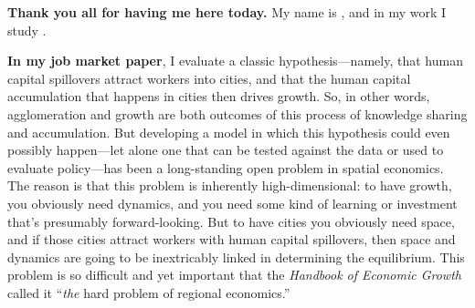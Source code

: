 \documentclass{jmstatement}
\begin{document}
\pagestyle{fancy}
\fancyhf{}
\fancyhead[L]{\bfseries\scshape \myname}
\fancyfoot[C]{\thepage}







\textbf{Thank you all for having me here today.} My name is \myname, and in
my work I study \onesenID.


\textbf{In my job market paper},
I evaluate a classic hypothesis---namely, that
human capital spillovers attract workers into cities,
and that the human capital accumulation that happens in cities then drives growth.
So, in other words, agglomeration and growth are both outcomes of this process
of knowledge sharing and accumulation.
But developing a model in which this hypothesis could even possibly happen---let
alone one that can be tested against the data or used to evaluate policy---has
been a long-standing open problem in spatial economics.
The reason is that this problem is inherently high-dimensional:
to have growth, you obviously need dynamics, and you need some kind of learning
or investment that's presumably forward-looking.
But to have cities you obviously need space,
and if those cities attract workers with human capital spillovers, then
space and dynamics are going to be inextricably linked in determining the equilibrium.
This problem is so difficult and yet important that the
\textit{Handbook of Economic Growth}
called it ``\textit{the} hard problem of regional economics.''
\end{document}
